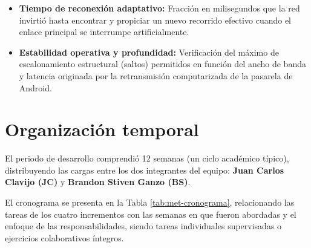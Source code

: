 \documentclass[12pt,oneside]{scrreprt}
\begin{document}
\begin{itemize}
    \item \textbf{Tiempo de reconexión adaptativo:} Fracción en milisegundos que la red invirtió hasta encontrar y propiciar un nuevo recorrido efectivo cuando el enlace principal se interrumpe artificialmente.
    \item \textbf{Estabilidad operativa y profundidad:} Verificación del máximo de escalonamiento estructural (saltos) permitidos en función del ancho de banda y latencia originada por la retransmisión computarizada de la pasarela de Android.
\end{itemize}

\section{Organización temporal}

El periodo de desarrollo comprendió 12 semanas (un ciclo académico típico), distribuyendo las cargas entre los dos integrantes del equipo: \textbf{Juan Carlos Clavijo (JC)} y \textbf{Brandon Stiven Ganzo (BS)}.

El cronograma se presenta en la Tabla \ref{tab:met-cronograma}, relacionando las tareas de los cuatro incrementos con las semanas en que fueron abordadas y el enfoque de las responsabilidades, siendo tareas individuales supervisadas o ejercicios colaborativos íntegros.

\vspace{-0.5cm}
\end{document}
